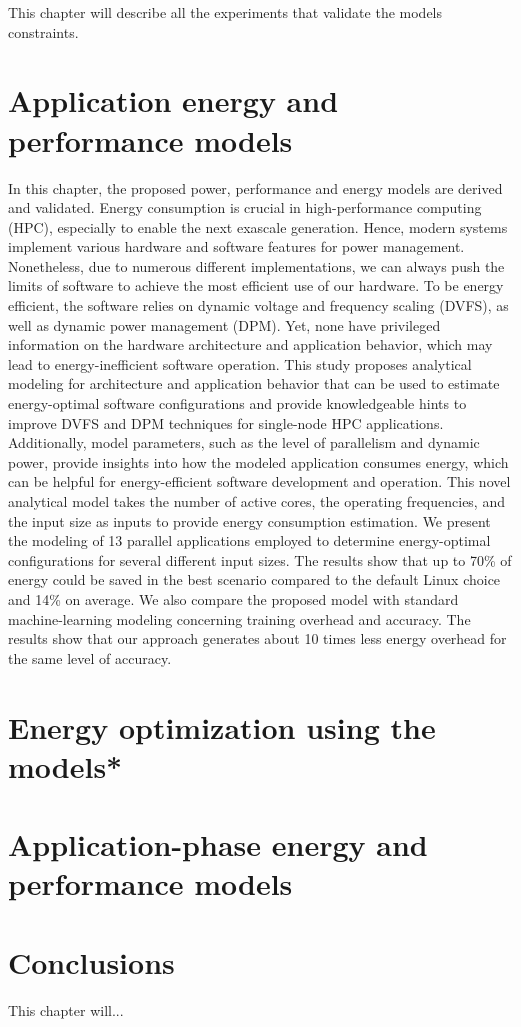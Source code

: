 \documentclass[
papersize=a4,
pagelayout=default,
fontname=latinmodern,
fontsize=11pt,
twoside,
final,
faculty=fpms,
]{umons-Thesis}
\begin{document}
	
	
	
	This chapter will describe all the experiments that validate the models constraints.
	
	
	\chapter{Application energy and performance models} \label{chapter:models}
	In this chapter, the proposed power, performance and energy models are derived and validated.
	Energy consumption is crucial in high-performance computing (HPC), especially to enable the next exascale generation. Hence, modern systems implement various hardware and software features for power management. Nonetheless, due to numerous different implementations, we can always push the limits of software to achieve the most efficient use of our hardware. To be
	energy efficient, the software relies on dynamic voltage and frequency scaling (DVFS), as well as dynamic power management (DPM). Yet, none have privileged information on the hardware architecture and application behavior, which may lead to energy-inefficient software operation. 
	This study  proposes analytical modeling for architecture and application behavior that can be used to estimate energy-optimal software configurations and provide knowledgeable hints to improve DVFS and DPM techniques for single-node HPC applications.
	Additionally, model parameters, such as the level of parallelism and dynamic power, provide insights into how the modeled application consumes energy, which can be helpful for energy-efficient software development and operation.
	This novel analytical model takes the number of active cores, the operating frequencies, and the input size as inputs to provide energy consumption estimation.
	We present the modeling of 13 parallel applications employed to determine energy-optimal configurations for several different input sizes.
	The results show that up to 70\% of energy could be saved in the best scenario compared to the default Linux choice and 14\% on average.
	We also compare the proposed model with standard machine-learning modeling concerning training overhead and accuracy. The results show that our approach generates about 10 times less energy overhead for the same level of accuracy.
	
	
	\chapter{Energy optimization using the models*}
	
	
	
	\chapter{Application-phase energy and performance models}
	
	
	
	\chapter{Conclusions}
	This chapter will...
	
	
	
	
	\backmatter
	
\end{document}
